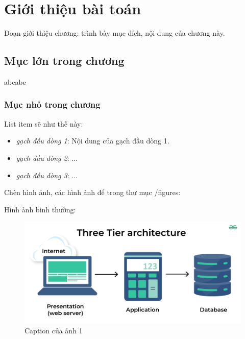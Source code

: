 \clearpage
{}

\setcounter{chapter}{0}
\chapter[{GIỚI THIỆU BÀI TOÁN}]{Giới thiệu bài toán}

Đoạn giới thiệu chương: trình bày mục đích, nội dung của chương này. 

\vspace{0.3cm}

\section{Mục lớn trong chương}

abcabc

\subsection{Mục nhỏ trong chương}


List item sẽ như thế này:

\renewcommand{\labelitemi}{$-$}
\begin{itemize}
	\item \textit{gạch đầu dòng 1}: Nội dung của gạch đầu dòng 1.
	\item \textit{gạch đầu dòng 2}: ...
	\item \textit{gạch đầu dòng 3}: ...
\end{itemize} 
\vspace{0.3cm}

\vspace{0.3cm}




Chèn hình ảnh, các hình ảnh để trong thư mục /figures: 

Hình ảnh bình thường:
\begin{figure} [!htb]
	\centering
    \includegraphics[width=1\linewidth]{figures/three-tier-architecture.png}
	\caption{Caption của ảnh 1}
	\label{fig:UET_logo2}
\end{figure}


